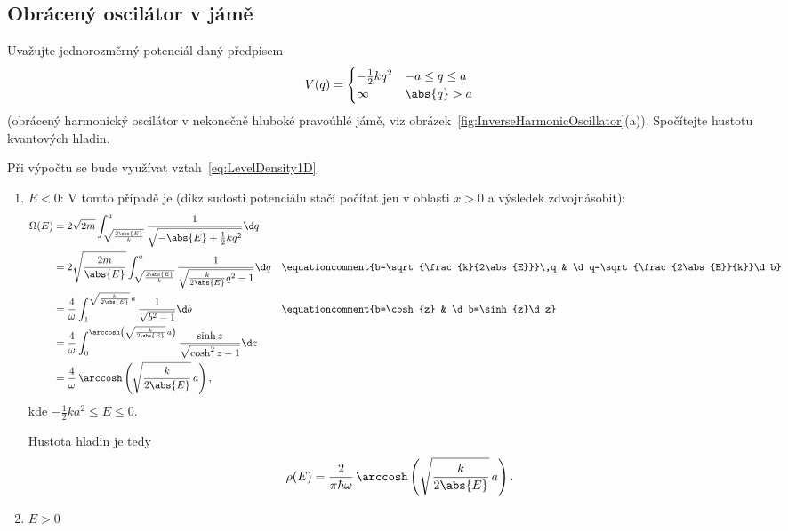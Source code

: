 \subsection{Obrácený oscilátor v jámě}
	Uvažujte jednorozměrný potenciál daný předpisem
	\begin{equation}\label{eq:InverseHarmonicOscillator}
		V(q)=
			\begin{cases}
				-\frac{1}{2}kq^{2} & -a\leq q\leq a\\
				\infty & \abs{q}>a
			\end{cases}
	\end{equation}
	(obrácený harmonický oscilátor v nekonečně hluboké pravoúhlé jámě, viz obrázek~\ref{fig:InverseHarmonicOscillator}(a)).
	Spočítejte hustotu kvantových hladin.
	
	\begin{solution}
		Při výpočtu se bude využívat vztah~\eqref{eq:LevelDensity1D}.
		
		\begin{enumerate}
			\item $E<0$:		
				V tomto případě je
				(díkz sudosti potenciálu stačí počítat jen v oblasti $x>0$ a výsledek zdvojnásobit):
				\begin{align*}
				\Omega(E)
					&=2\sqrt{2m}\int_{\sqrt{\frac{2\abs{E}}{k}}}^{a}\frac{1}{\sqrt{-\abs{E}+\frac{1}{2}kq^{2}}}\d q\\
					&=2\sqrt{\frac{2m}{\abs{E}}}\int_{\sqrt{\frac{2\abs{E}}{k}}}^{a}\frac{1}{\sqrt{\frac{k}{2\abs{E}}q^{2}-1}}\d q
					&&\equationcomment{b=\sqrt{\frac{k}{2\abs{E}}}\,q & \d q=\sqrt{\frac{2\abs{E}}{k}}\d b}\\
					&=\frac{4}{\omega}\int_{1}^{\sqrt{\frac{k}{2\abs{E}}}\,a}\frac{1}{\sqrt{b^{2}-1}}\d b
					&&\equationcomment{b=\cosh{z} & \d b=\sinh{z}\d z}\\
					&=\frac{4}{\omega}\int_{0}^{\arccosh\left(\sqrt{\frac{k}{2\abs{E}}}\,a\right)}
						\frac{\sinh{z}}{\sqrt{\cosh^{2}{z}-1}}\d z\\
					&=\frac{4}{\omega}\,\arccosh\left(\sqrt{\frac{k}{2\abs{E}}}\,a\right),
				\end{align*}
				kde $-\frac{1}{2}ka^{2}\leq E\leq0$.
				
				Hustota hladin je tedy
				\begin{equation*}
					\rho(E)
						=\frac{2}{\pi\hbar\omega}\,\arccosh\left(\sqrt{\frac{k}{2\abs{E}}}\,a\right).
				\end{equation*}
			
			\item $E>0$
			

\end{enumerate}
\end{solution}
